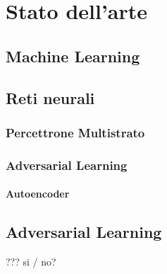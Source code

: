 \chapter{Stato dell'arte}
\label{statodellarte}

\section{Machine Learning}

\section{Reti neurali}

\subsection{Percettrone Multistrato}
\subsection{Adversarial Learning}
\subsubsection{Autoencoder}

\section{Adversarial Learning}
??? si / no?